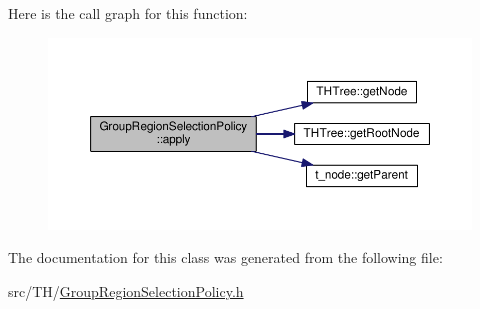 Here is the call graph for this function\+:\nopagebreak
\begin{figure}[H]
\begin{center}
\leavevmode
\includegraphics[width=350pt]{classGroupRegionSelectionPolicy_a28a39331dafaa273d30bef8f0da9e4fb_cgraph}
\end{center}
\end{figure}




The documentation for this class was generated from the following file\+:\begin{DoxyCompactItemize}
\item 
src/\+T\+H/\hyperlink{GroupRegionSelectionPolicy_8h}{Group\+Region\+Selection\+Policy.\+h}\end{DoxyCompactItemize}
